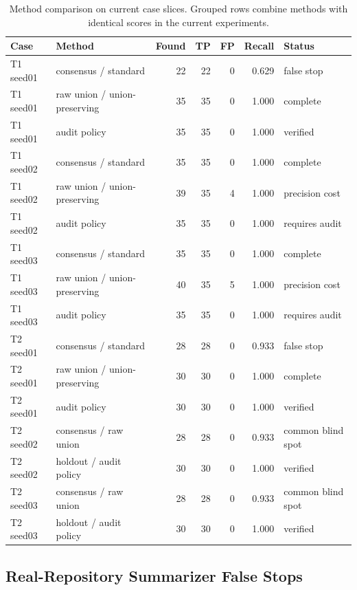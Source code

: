 \documentclass[letterpaper]{article}
\begin{document}
\begin{table}[t]
\centering
\small
\begin{tabular}{llrrrrl}
\toprule
Case & Method & Found & TP & FP & Recall & Status \\
\midrule
T1 seed01 & consensus / standard & 22 & 22 & 0 & 0.629 & false stop \\
T1 seed01 & raw union / union-preserving & 35 & 35 & 0 & 1.000 & complete \\
T1 seed01 & audit policy & 35 & 35 & 0 & 1.000 & verified \\
\midrule
T1 seed02 & consensus / standard & 35 & 35 & 0 & 1.000 & complete \\
T1 seed02 & raw union / union-preserving & 39 & 35 & 4 & 1.000 & precision cost \\
T1 seed02 & audit policy & 35 & 35 & 0 & 1.000 & requires audit \\
\midrule
T1 seed03 & consensus / standard & 35 & 35 & 0 & 1.000 & complete \\
T1 seed03 & raw union / union-preserving & 40 & 35 & 5 & 1.000 & precision cost \\
T1 seed03 & audit policy & 35 & 35 & 0 & 1.000 & requires audit \\
\midrule
T2 seed01 & consensus / standard & 28 & 28 & 0 & 0.933 & false stop \\
T2 seed01 & raw union / union-preserving & 30 & 30 & 0 & 1.000 & complete \\
T2 seed01 & audit policy & 30 & 30 & 0 & 1.000 & verified \\
\midrule
T2 seed02 & consensus / raw union & 28 & 28 & 0 & 0.933 & common blind spot \\
T2 seed02 & holdout / audit policy & 30 & 30 & 0 & 1.000 & verified \\
\midrule
T2 seed03 & consensus / raw union & 28 & 28 & 0 & 0.933 & common blind spot \\
T2 seed03 & holdout / audit policy & 30 & 30 & 0 & 1.000 & verified \\
\bottomrule
\end{tabular}
\caption{Method comparison on current case slices. Grouped rows combine methods
with identical scores in the current experiments.}
\label{tab:methods}
\end{table}

\subsection{Real-Repository Summarizer False Stops}
\end{document}
